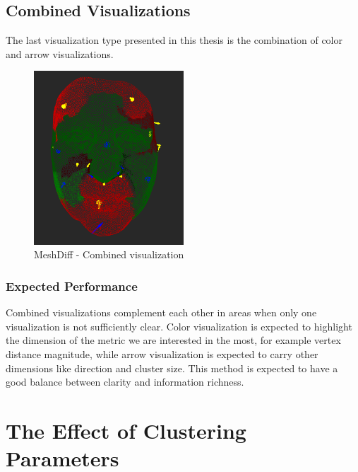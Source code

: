 \subsection{Combined Visualizations}

The last visualization type presented in this thesis is the combination of color and arrow visualizations.

\begin{figure}[h]
\centering
\includegraphics[width=0.5\textwidth]{./img/meshdiff-combination.PNG}
\caption[MeshDiff - Combined visualization]{MeshDiff - Combined visualization}
\label{fig:meshdiff_combination}
\end{figure}

\subsubsection{Expected Performance}

Combined visualizations complement each other in areas when only one visualization is not sufficiently clear. Color visualization is expected to highlight the dimension of the metric we are interested in the most, for example vertex distance magnitude, while arrow visualization is expected to carry other dimensions like direction and cluster size. This method is expected to have a good balance between clarity and information richness.
\section{The Effect of Clustering Parameters}
\label{sec:parameter_effect}

